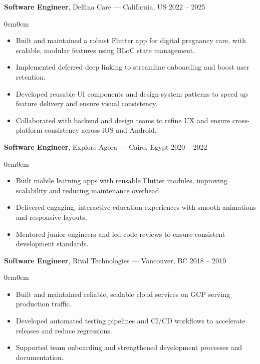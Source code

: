\documentclass[11pt, letterpaper]{article}
\newenvironment{highlights}{
    \begin{itemize}[
        topsep=0.10cm,
        parsep=0.10cm,
        partopsep=0pt,
        itemsep=0pt,
        leftmargin=10pt
    ]
}{
    \end{itemize}
}
\newenvironment{onecolentry}{
    \begin{adjustwidth}{0cm}{0cm}
}{
    \end{adjustwidth}
}
\begin{document}
\vspace{0.3cm}

\textbf{Software Engineer}, Delfina Care — California, US \hfill 2022 – 2025
\vspace{0.1cm}
\begin{onecolentry}
    \begin{highlights}
        \item Built and maintained a robust Flutter app for digital pregnancy care, with scalable, modular features using BLoC state management.
        \item Implemented deferred deep linking to streamline onboarding and boost user retention.
        \item Developed reusable UI components and design-system patterns to speed up feature delivery and ensure visual consistency.
        \item Collaborated with backend and design teams to refine UX and ensure cross-platform consistency across iOS and Android.
    \end{highlights}
\end{onecolentry}

\vspace{0.3cm}

\textbf{Software Engineer}, Explore Agora — Cairo, Egypt \hfill 2020 – 2022
\vspace{0.1cm}
\begin{onecolentry}
    \begin{highlights}
        \item Built mobile learning apps with reusable Flutter modules, improving scalability and reducing maintenance overhead.
        \item Delivered engaging, interactive education experiences with smooth animations and responsive layouts.
        \item Mentored junior engineers and led code reviews to ensure consistent development standards.
    \end{highlights}
\end{onecolentry}

\vspace{0.3cm}

\textbf{Software Engineer}, Rival Technologies — Vancouver, BC \hfill 2018 – 2019
\vspace{0.1cm}
\begin{onecolentry}
    \begin{highlights}
        \item Built and maintained reliable, scalable cloud services on GCP serving production traffic.
        \item Developed automated testing pipelines and CI/CD workflows to accelerate releases and reduce regressions.
        \item Supported team onboarding and strengthened development processes and documentation.
    \end{highlights}
\end{onecolentry}
\end{document}
